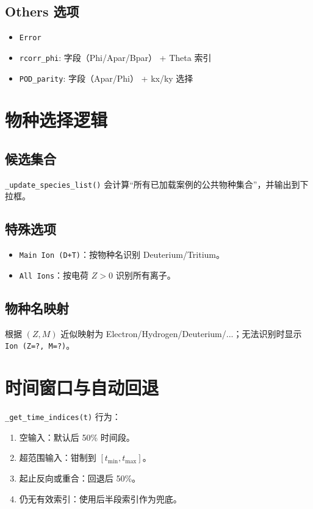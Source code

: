 \documentclass[11pt,a4paper]{ctexart}
\begin{document}
\subsection{Others 选项}
\begin{itemize}
  \item \texttt{Error}
  \item \texttt{rcorr\_phi}: 字段（Phi/Apar/Bpar） + Theta 索引
  \item \texttt{POD\_parity}: 字段（Apar/Phi） + kx/ky 选择
\end{itemize}

\section{物种选择逻辑}
\subsection{候选集合}
\texttt{\_update\_species\_list()} 会计算“所有已加载案例的公共物种集合”，并输出到下拉框。

\subsection{特殊选项}
\begin{itemize}
  \item \texttt{Main Ion (D+T)}：按物种名识别 Deuterium/Tritium。
  \item \texttt{All Ions}：按电荷 \(Z>0\) 识别所有离子。
\end{itemize}

\subsection{物种名映射}
根据 \((Z,M)\) 近似映射为 Electron/Hydrogen/Deuterium/...；无法识别时显示
\texttt{Ion (Z=?, M=?)}。

\section{时间窗口与自动回退}
\texttt{\_get\_time\_indices(t)} 行为：
\begin{enumerate}
  \item 空输入：默认后 50\% 时间段。
  \item 超范围输入：钳制到 \([t_{\min},t_{\max}]\)。
  \item 起止反向或重合：回退后 50\%。
  \item 仍无有效索引：使用后半段索引作为兜底。
\end{enumerate}
\end{document}
